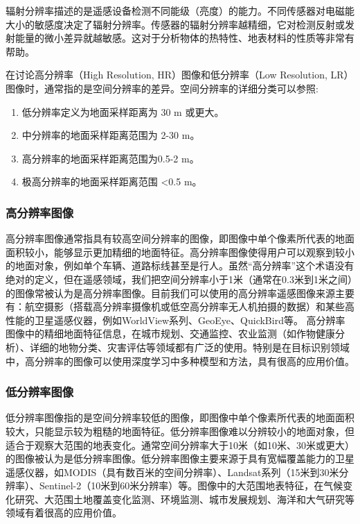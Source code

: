 辐射分辨率描述的是遥感设备检测不同能级（亮度）的能力。不同传感器对电磁能大小的敏感度决定了辐射分辨率。传感器的辐射分辨率越精细，它对检测反射或发射能量的微小差异就越敏感。这对于分析物体的热特性、地表材料的性质等非常有帮助。


在讨论高分辨率（High Resolution, HR）图像和低分辨率（Low Resolution, LR）图像时，通常指的是空间分辨率的差异。空间分辨率的详细分类可以参照\cite{MultispectralImageAnalysisUsingObjectOrientedParadigm}:
\begin{enumerate}
    \item 低分辨率定义为地面采样距离为 30 m 或更大。
    \item 中分辨率的地面采样距离范围为 2-30 m。
    \item 高分辨率的地面采样距离范围为0.5-2 m。
    \item 极高分辨率的地面采样距离范围 <0.5 m。
\end{enumerate}

\subsubsection{高分辨率图像}
高分辨率图像通常指具有较高空间分辨率的图像，即图像中单个像素所代表的地面面积较小，能够显示更加精细的地面特征\cite{shimizu1983laser}。高分辨率图像使得用户可以观察到较小的地面对象，例如单个车辆、道路标线甚至是行人。虽然“高分辨率”这个术语没有绝对的定义，但在遥感领域，我们把空间分辨率小于1米（通常在0.3米到1米之间）的图像常被认为是高分辨率图像。目前我们可以使用的高分辨率遥感图像来源主要有：航空摄影（搭载高分辨率摄像机或低空高分辨率无人机拍摄的数据）和某些高性能的卫星遥感仪器，例如WorldView系列\cite{scitor2000project}、GeoEye、QuickBird等。
高分辨率图像中的精细地面特征信息，在城市规划、交通监控、农业监测（如作物健康分析）、详细的地物分类、灾害评估等领域都有广泛的使用。特别是在目标识别领域中，高分辨率的图像可以使用深度学习中多种模型和方法，具有很高的应用价值。


\subsubsection{低分辨率图像}

低分辨率图像指的是空间分辨率较低的图像，即图像中单个像素所代表的地面面积较大，只能显示较为粗糙的地面特征。低分辨率图像难以分辨较小的地面对象，但适合于观察大范围的地表变化。通常空间分辨率大于10米（如10米、30米或更大）的图像被认为是低分辨率图像。低分辨率图像主要来源于具有宽幅覆盖能力的卫星遥感仪器，如MODIS（具有数百米的空间分辨率）、Landsat系列（15米到30米分辨率）、Sentinel-2（10米到60米分辨率）等。图像中的大范围地表特征，在气候变化研究、大范围土地覆盖变化监测、环境监测、城市发展规划、海洋和大气研究等领域有着很高的应用价值。

